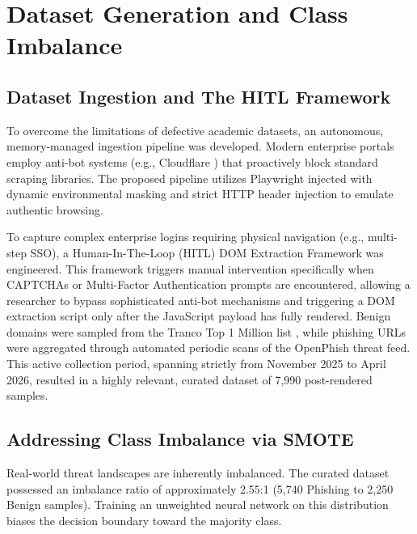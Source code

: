 \documentclass[conference]{IEEEtran}
\begin{document}
\section{Dataset Generation and Class Imbalance}

\subsection{Dataset Ingestion and The HITL Framework}
To overcome the limitations of defective academic datasets, an autonomous, memory-managed ingestion pipeline was developed. Modern enterprise portals employ anti-bot systems (e.g., Cloudflare \cite{cloudflare}) that proactively block standard scraping libraries. The proposed pipeline utilizes Playwright \cite{playwright} injected with dynamic environmental masking and strict HTTP header injection to emulate authentic browsing.

To capture complex enterprise logins requiring physical navigation (e.g., multi-step SSO), a Human-In-The-Loop (HITL) DOM Extraction Framework was engineered. This framework triggers manual intervention specifically when CAPTCHAs or Multi-Factor Authentication prompts are encountered, allowing a researcher to bypass sophisticated anti-bot mechanisms and triggering a DOM extraction script only after the JavaScript payload has fully rendered. Benign domains were sampled from the Tranco Top 1 Million list \cite{tranco}, while phishing URLs were aggregated through automated periodic scans of the OpenPhish threat feed. This active collection period, spanning strictly from November 2025 to April 2026, resulted in a highly relevant, curated dataset of 7,990 post-rendered samples.

\subsection{Addressing Class Imbalance via SMOTE}
Real-world threat landscapes are inherently imbalanced. The curated dataset possessed an imbalance ratio of approximately 2.55:1 (5,740 Phishing to 2,250 Benign samples). Training an unweighted neural network on this distribution biases the decision boundary toward the majority class.
\end{document}
